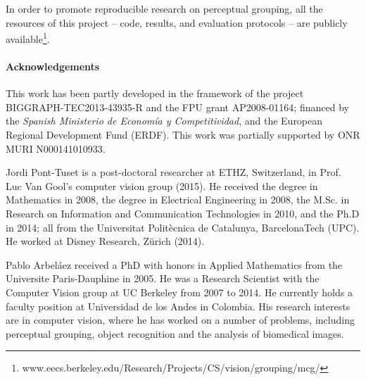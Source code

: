 \documentclass[10pt,journal,cspaper,compsoc]{IEEEtran}
\begin{document}
In order to promote reproducible research on perceptual grouping,
all the resources of this project -- code, results, and evaluation protocols -- are publicly available\footnote{\scriptsize{www.eecs.berkeley.edu/Research/Projects/CS/vision/grouping/mcg/}}.\vspace{4mm}

\paragraph*{\textbf{Acknowledgements}}
This work has been partly developed in the framework of the project BIGGRAPH-TEC2013-43935-R and the FPU grant AP2008-01164; financed by the \textit{Spanish Ministerio de Econom\'ia y 
Competitividad}, and the European Regional Development Fund (ERDF).
This work was partially supported by ONR MURI N000141010933.






\begin{IEEEbiography}
{Jordi Pont-Tuset} is a post-doctoral researcher at ETHZ, Switzerland,
in Prof. Luc Van Gool's computer vision group (2015).
He received the degree in Mathematics in 2008, the degree in Electrical Engineering 
in 2008, the M.Sc. in Research on Information and Communication Technologies in 2010, and the Ph.D in
2014; all from the Universitat Polit\`{e}cnica de Catalunya, BarcelonaTech (UPC).
He worked at Disney Research, Z\"urich (2014).
\end{IEEEbiography}

\begin{IEEEbiography}
{Pablo Arbel\'{a}ez} received a PhD with honors in Applied Mathematics from the Universite Paris-Dauphine in 2005. 
He was a Research Scientist with the Computer Vision group at UC Berkeley from 2007 to 2014. 
He currently holds a faculty position at Universidad de los Andes in Colombia.
His research interests are in computer vision, where he has worked on a number of problems, including perceptual grouping,
object recognition and the analysis of biomedical images.
\end{IEEEbiography}
\end{document}
